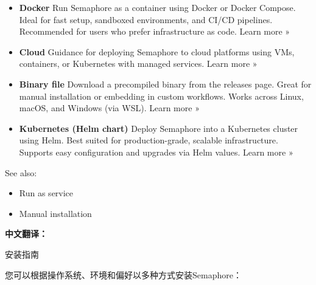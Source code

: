 \documentclass[12pt,UTF8]{ctexbook}
\begin{document}
\begin{itemize}[leftmargin=3.5em]
\begin{itemize}[leftmargin=2em]
\begin{verbatim}
        sudo dpkg -i semaphore_2.17.15_linux_amd64.deb
        \end{verbatim}
        
        \textbf{Setup and Run Semaphore}:
        \begin{verbatim}
        semaphore setup
        
        semaphore server --config=./config.json
        \end{verbatim}
        
        Semaphore will be available via this URL https://localhost:3000.
    \end{itemize}
    
    \item \textbf{Docker} 
    Run Semaphore as a container using Docker or Docker Compose. Ideal for fast setup, sandboxed environments, and CI/CD pipelines. Recommended for users who prefer infrastructure as code. 
    Learn more » 
    
    \item \textbf{Cloud} 
    Guidance for deploying Semaphore to cloud platforms using VMs, containers, or Kubernetes with managed services. 
    Learn more » 
    
    \item \textbf{Binary file} 
    Download a precompiled binary from the releases page. Great for manual installation or embedding in custom workflows. Works across Linux, macOS, and Windows (via WSL). 
    Learn more » 
    
    \item \textbf{Kubernetes (Helm chart)} 
    Deploy Semaphore into a Kubernetes cluster using Helm. Best suited for production-grade, scalable infrastructure. Supports easy configuration and upgrades via Helm values. 
    Learn more » 
\end{itemize}

See also: 

\begin{itemize}[leftmargin=3.5em]
    \item Run as service 
    \item Manual installation 
\end{itemize}

\textbf{中文翻译：}

安装指南

您可以根据操作系统、环境和偏好以多种方式安装Semaphore：
\end{document}
